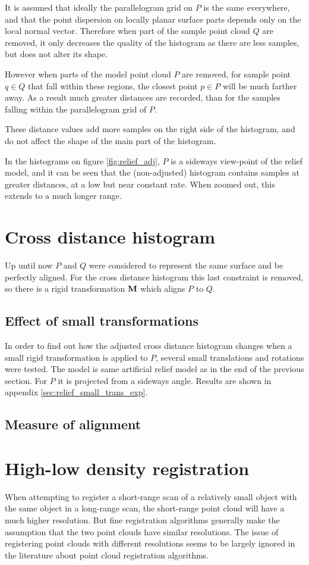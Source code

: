 It is assumed that ideally the parallelogram grid on $P$ is the same everywhere, and that the point dispersion on locally planar surface parts depends only on the local normal vector. Therefore when part of the sample point cloud $Q$ are removed, it only decreases the quality of the histogram as there are less samples, but does not alter its shape.

However when parts of the model point cloud $P$ are removed, for sample point $q \in Q$ that fall within these regions, the closest point $p \in P$ will be much farther away. As a result much greater distances are recorded, than for the samples falling within the parallelogram grid of $P$.

These distance values add more samples on the right side of the histogram, and do not affect the shape of the main part of the histogram.

In the histograms on figure \ref{fig:relief_adj}, $P$ is a sideways view-point of the relief model, and it can be seen that the (non-adjusted) histogram contains samples at greater distances, at a low but near constant rate. When zoomed out, this extends to a much longer range.


\section{Cross distance histogram}
Up until now $P$ and $Q$ were considered to represent the same surface and be perfectly aligned. For the cross distance histogram this last constraint is removed, so there is a rigid transformation $\mathbf{M}$ which aligns $P$ to $Q$.

\subsection{Effect of small transformations}
In order to find out how the adjusted cross distance histogram changes when a small rigid transformation is applied to $P$, several small translations and rotations were tested. The model is same artificial relief model as in the end of the previous section. For $P$ it is projected from a sideways angle. Results are shown in appendix \ref{sec:relief_small_trans_exp}.


\subsection{Measure of alignment}


\section{High-low density registration}
When attempting to register a short-range scan of a relatively small object with the same object in a long-range scan, the short-range point cloud will have a much higher resolution. But fine registration algorithms generally make the assumption that the two point clouds have similar resolutions. The issue of registering point clouds with different resolutions seems to be largely ignored in the literature about point cloud registration algorithms.

